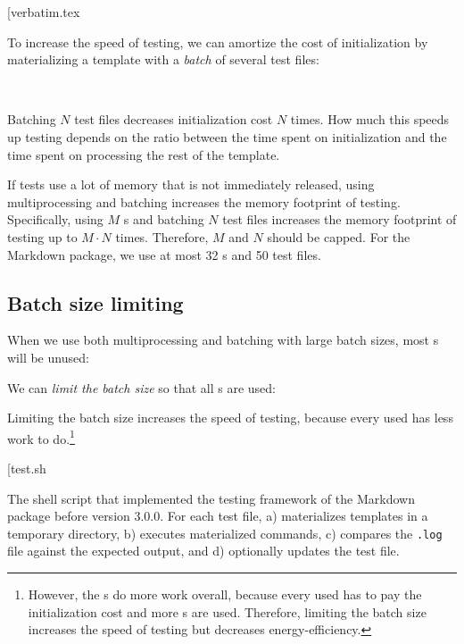 \documentclass[final]{ltugboat}
\makeatletter
\newenvironment{listing*}{\@dblfloat{listing}}{\end@dblfloat}
\newcounter{listing}
\makeatother
\begin{document}
\smallskip
\noindent
\example*[{verbatim.tex}

\smallskip

To increase the speed of testing, we can amortize the cost of initialization by materializing a template with a \emph{batch} of several test files:

\medskip
\noindent
{} \\

\smallskip
\noindent
Batching $N$ test files decreases initialization cost $N$ times. How much this speeds up testing depends on the ratio between the time spent on initialization and the time spent on processing the rest of the template.

If tests use a lot of memory that is not immediately released, using multiprocessing and batching increases the memory footprint of testing. Specifically, using $M$ s and batching $N$ test files increases the memory footprint of testing up to $M\cdot N$ times. Therefore, $M$ and $N$ should be capped. For the Markdown package, we use at most 32 s and 50 test files.

\subsection{Batch size limiting}

When we use both multiprocessing and batching with large batch sizes, most s will be unused:

\smallskip
\noindent
\begingroup
\centering

\par
\endgroup

\smallskip
\noindent
We can \emph{limit the batch size} so that all s are used:

\medskip
\noindent
\begingroup
\centering

\par
\endgroup

\smallskip
\noindent
{}
Limiting the batch size increases the speed of testing, because every used  has less work to do.\footnote{However, the s do more work overall, because every used  has to pay the initialization cost and more s are used. Therefore, limiting the batch size increases the speed of testing but decreases energy-efficiency.}

\begin{listing*}
\bigExample*[{test.sh}
\caption{The shell script  that implemented the testing framework of the Markdown package before version 3.0.0. For each test file,  a) materializes templates in a temporary directory, b) executes materialized commands, c) compares the \texttt{.log} file against the expected output, and d) optionally updates the test file.}
\label{lst:test.sh}
\end{listing*}
\end{document}
